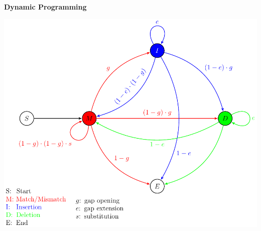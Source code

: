 \textbf{Dynamic Programming}
    \begin{center}
        \hspace*{-3cm}\includegraphics[scale=0.75]{figures/fig-dp-model.pdf}
    \end{center}

%


